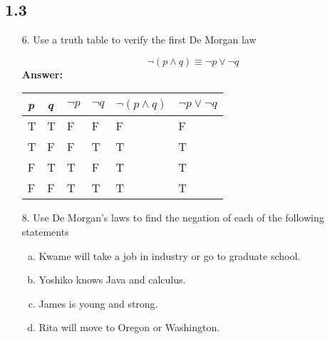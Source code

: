 \subsection{1.3}
\begin{itemize}
 \item[6.]Use a truth table to verify the first De Morgan law

\[
    \neg (p \land q) \equiv \neg p \lor \neg q 
\]
\textbf{Answer:}
\begin{longtable}[c]{|l|l|l|l|l|l|}
    \hline
   \textit{p} & \textit{q} & $\neg p$ & $\neg q$ & $\neg (p \land q)$ & $\neg p \lor \neg q$ \\
   \hline
   \endfirsthead
   T & T & F & F & F & F \\
   \hline
   T & F & F & T & T & T \\
   \hline
   F & T & T & F & T & T \\
   \hline
   F & F & T & T & T & T \\
   \hline
\end{longtable}
\item[8.]Use De Morgan’s laws to find the negation of each of the following statements 
\begin{enumerate}[a.]
\item Kwame will take a job in industry or go to graduate school.
\item Yoshiko knows Java and calculus.
\item James is young and strong.
\item Rita will move to Oregon or Washington.
\end{enumerate}   

\end{itemize}
